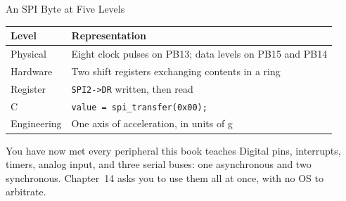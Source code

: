 \documentclass[9pt,aspectratio=169,xcolor=table]{beamer}
\begin{document}
\begin{frame}{An SPI Byte at Five Levels}
    \begin{center}
    {\small
    \striped
    \begin{tabular}{@{}l R{.65\textwidth}@{}}
        \toprule
        \textbf{Level} & \textbf{Representation} \\
        \midrule
        Physical    & Eight clock pulses on PB13; data levels on PB15 and PB14 \\
        Hardware    & Two shift registers exchanging contents in a ring \\
        Register    & \texttt{SPI2->DR} written, then read \\
        C           & \texttt{value = spi\_transfer(0x00);} \\
        Engineering & One axis of acceleration, in units of g \\
        \bottomrule
    \end{tabular}}
    \end{center}

    \vspace{3mm}
    \begin{block}{You have now met every peripheral this book teaches}
        Digital pins, interrupts, timers, analog input, and three serial
        buses: one asynchronous and two synchronous. Chapter~14 asks you
        to use them \alert{all at once}, with no OS to arbitrate.
    \end{block}
\end{frame}
\end{document}
